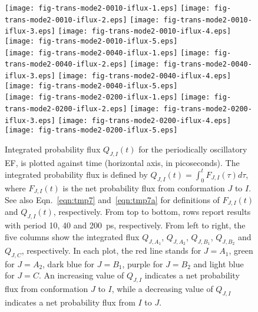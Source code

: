 \documentclass[a4paper,preprint,unsortedaddress,onecolumn]{revtex4-1}
\newcommand{\recheck}[1]{{\color{red} #1}}
\begin{document}
\begin{figure}
  \centering
  \texttt{[image: fig-trans-mode2-0010-iflux-1.eps]}
  \texttt{[image: fig-trans-mode2-0010-iflux-2.eps]}
  \texttt{[image: fig-trans-mode2-0010-iflux-3.eps]}
  \texttt{[image: fig-trans-mode2-0010-iflux-4.eps]}
  \texttt{[image: fig-trans-mode2-0010-iflux-5.eps]}\\
  \texttt{[image: fig-trans-mode2-0040-iflux-1.eps]}
  \texttt{[image: fig-trans-mode2-0040-iflux-2.eps]}
  \texttt{[image: fig-trans-mode2-0040-iflux-3.eps]}
  \texttt{[image: fig-trans-mode2-0040-iflux-4.eps]}
  \texttt{[image: fig-trans-mode2-0040-iflux-5.eps]}\\
  \texttt{[image: fig-trans-mode2-0200-iflux-1.eps]}
  \texttt{[image: fig-trans-mode2-0200-iflux-2.eps]}
  \texttt{[image: fig-trans-mode2-0200-iflux-3.eps]}
  \texttt{[image: fig-trans-mode2-0200-iflux-4.eps]}
  \texttt{[image: fig-trans-mode2-0200-iflux-5.eps]}\\
  \caption{
    Integrated probability flux $Q_{J,I}(t)$ for the periodically
    oscillatory EF, is plotted against time (horizontal axis, in picoseconds).
    The integrated
    probability flux is defined by $Q_{J,I}(t) = \int_0^t F_{J,I}(\tau) d\tau$, where
    $F_{J,I}(t)$ is the net probability flux from conformation $J$ to $I$.
    See also Eqn.~\eqref{eqn:tmp7} and~\eqref{eqn:tmp7a} for definitions
    of $F_{J,I}(t)$ and $Q_{J,I}(t)$, respectively.
    From top to bottom, rows report results with  period 10, 40 and 200~ps, respectively.
    From left to right, the five
    columns show the integrated flux $Q_{J,A_1}$, $Q_{J,A_2}$,
    $Q_{J,B_1}$, $Q_{J,B_2}$ and $Q_{J,C}$, respectively. In each plot,
    the red line stands for $J=A_1$, green for $J=A_2$, dark blue for $J=B_1$,
    purple for $J=B_2$ and light blue for $J=C$.
    \recheck{An increasing value of $Q_{J,I}$ indicates a net probability
      flux from conformation $J$ to $I$,
      while a decreasing value of $Q_{J,I}$ indicates a net probability
      flux from $I$ to $J$.
    }
  }
  \label{fig:tmp10}
\end{figure}
\end{document}

